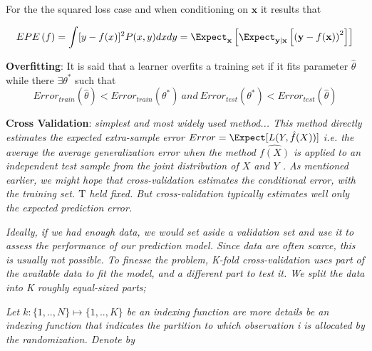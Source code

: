 For the the squared loss case and when conditioning on $\textbf{x}$ it results that

\begin{equation} \label{eq:expectedError}
EPE\left(f \right) = \int [y - f(x)]^2 P(x,y)dxdy

\\
= \Expect_{\textbf{x}} \left[ \Expect_{\textbf{y}|\textbf{x}} \left[  \left( \textbf{y} - f(\textbf{x})  \right)^2 \right]  \right]

\end{equation}


\textbf{Overfitting}: 
It is said that a learner overfits a training set  if it fits parameter $\hat{\theta}$ while there $\exists \theta^*$ such that
\begin{equation} \label{eq:overfitting}
Error_{train}(\hat{\theta}) < Error_{train}(\theta^*) \  and \ Error_{test}(\theta^*) < Error_{test}(\hat{\theta})   
\end{equation}

\textbf{Cross Validation}:  
\textit{simplest and most widely used method... This method directly estimates the expected extra-sample error
$Error = \Expect[L(Y,\hat{f}(X))] $ i.e. the average the average generalization error when the method $\hat{f(X)}$ is applied to an independent test sample from the joint distribution of $X$ and $Y$ . As mentioned earlier, we might hope that cross-validation estimates the conditional error, with the training set. $\mathrm{T}$ held fixed. But cross-validation typically estimates well only the expected prediction error.}

\textit{Ideally, if we had enough data, we would set aside a validation set and use it to assess the performance of our prediction model. Since data are often scarce, this is usually not possible. To finesse the problem, K-fold cross-validation uses part of the available data to fit the model, and a different part to test it. We split the data into K roughly equal-sized parts; }

\textit{Let $k : \{1,..,N\} \mapsto \{1, .., K\}$ be an indexing function are more details be an indexing
function that indicates the partition to which observation i is allocated by the randomization. Denote by}


